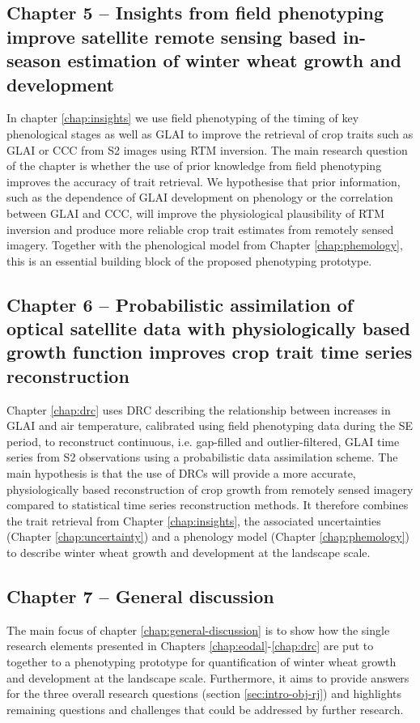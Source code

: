 \subsection*{Chapter 5 -- Insights from field phenotyping improve satellite remote sensing based in-season estimation of winter wheat growth and development}
In chapter \ref{chap:insights} we use field phenotyping of the timing of key phenological stages as well as \gls{GLAI} to improve the retrieval of crop traits such as \gls{GLAI} or \gls{CCC} from \gls{S2} images using \gls{RTM} inversion. The main research question of the chapter is whether the use of prior knowledge from field phenotyping improves the accuracy of trait retrieval. We hypothesise that prior information, such as the dependence of \gls{GLAI} development on phenology or the correlation between \gls{GLAI} and \gls{CCC}, will improve the physiological plausibility of \gls{RTM} inversion and produce more reliable crop trait estimates from remotely sensed imagery. Together with the phenological model from Chapter \ref{chap:phemology}, this is an essential building block of the proposed phenotyping prototype.

\subsection*{Chapter 6 -- Probabilistic assimilation of optical satellite data with physiologically based growth function improves crop trait time series reconstruction}
Chapter \ref{chap:drc} uses \gls{DRC} describing the relationship between increases in \gls{GLAI} and air temperature, calibrated using field phenotyping data during the \gls{SE} period, to reconstruct continuous, i.e. gap-filled and outlier-filtered, \gls{GLAI} time series from \gls{S2} observations using a probabilistic data assimilation scheme. The main hypothesis is that the use of \gls{DRC}s will provide a more accurate, physiologically based reconstruction of crop growth from remotely sensed imagery compared to statistical time series reconstruction methods. It therefore combines the trait retrieval from Chapter \ref{chap:insights}, the associated uncertainties (Chapter \ref{chap:uncertainty}) and a phenology model (Chapter \ref{chap:phemology}) to describe winter wheat growth and development at the landscape scale.

\subsection*{Chapter 7 -- General discussion}
The main focus of chapter \ref{chap:general-discussion} is to show how the single research elements presented in Chapters \ref{chap:eodal}-\ref{chap:drc} are put to together to a phenotyping prototype for quantification of winter wheat growth and development at the landscape scale. Furthermore, it aims to provide answers for the three overall research questions (section \ref{sec:intro-obj-rj}) and highlights remaining questions and challenges that could be addressed by further research.